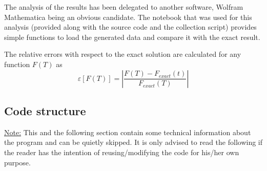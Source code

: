 \documentclass[11pt]{article}
\begin{document}
The analysis of the results has been delegated to another software, Wolfram Mathematica being an obvious candidate. The notebook that was used for this analysis (provided along with the source code and the collection script) provides simple functions to load the generated data and compare it with the exact result.

The relative errors with respect to the exact solution are calculated for any function $F(T)$ as
\[
	\varepsilon[F(T)] = \left\lvert\frac{F(T) - F_{exact}(t)}{F_{exact}(T)}\right\rvert
\]


\subsection{Code structure}

\underline{Note:} This and the following section contain some technical information about the program and can be quietly skipped. It is only advised to read the following if the reader has the intention of reusing/modifying the code for his/her own purpose.
\end{document}
